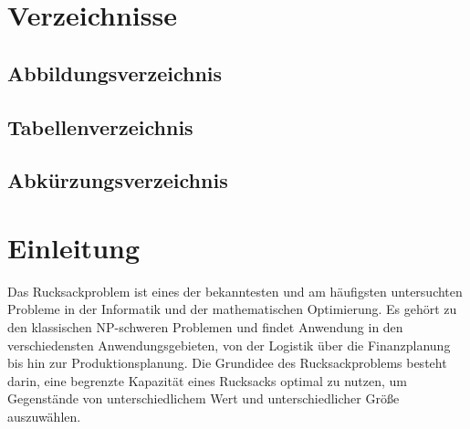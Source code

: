 \documentclass[12pt]{report}
\begin{document}
\tableofcontents
{}
\thispagestyle{plain}
\newpage
\chapter*{Verzeichnisse}

\section*{Abbildungsverzeichnis}

\listoffigures




\section*{Tabellenverzeichnis}

\listoftables


\section*{Abkürzungsverzeichnis}

\begin{acronym}[SOAP]
\end{acronym}


\addtocounter{frontmatterPage}{\value{page}} 

\thispagestyle{verzeichnisse}

\newpage
{}
\chapter{Einleitung}
Das Rucksackproblem ist eines der bekanntesten und am häufigsten untersuchten Probleme in der Informatik und der mathematischen Optimierung. Es gehört zu den klassischen NP-schweren Problemen und findet Anwendung in den verschiedensten Anwendungsgebieten, von der Logistik über die Finanzplanung bis hin zur Produktionsplanung. Die Grundidee des Rucksackproblems besteht darin, eine begrenzte Kapazität eines Rucksacks optimal zu nutzen, um Gegenstände von unterschiedlichem Wert und unterschiedlicher Größe auszuwählen. 
\end{document}
